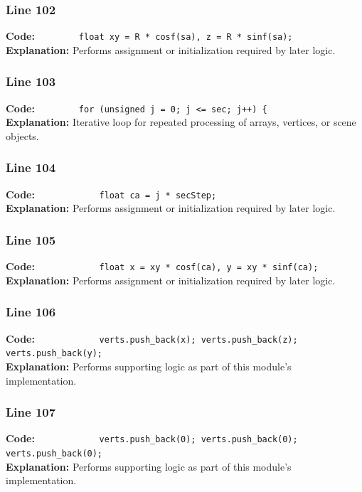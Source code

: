 \documentclass[11pt,a4paper]{article}
\begin{document}
\subsubsection*{Line 102}
\textbf{Code:} \verb|        float xy = R * cosf(sa), z = R * sinf(sa);|\\
\textbf{Explanation:} Performs assignment or initialization required by later logic.

\subsubsection*{Line 103}
\textbf{Code:} \verb|        for (unsigned j = 0; j <= sec; j++) {|\\
\textbf{Explanation:} Iterative loop for repeated processing of arrays, vertices, or scene objects.

\subsubsection*{Line 104}
\textbf{Code:} \verb|            float ca = j * secStep;|\\
\textbf{Explanation:} Performs assignment or initialization required by later logic.

\subsubsection*{Line 105}
\textbf{Code:} \verb|            float x = xy * cosf(ca), y = xy * sinf(ca);|\\
\textbf{Explanation:} Performs assignment or initialization required by later logic.

\subsubsection*{Line 106}
\textbf{Code:} \verb|            verts.push_back(x); verts.push_back(z); verts.push_back(y);|\\
\textbf{Explanation:} Performs supporting logic as part of this module's implementation.

\subsubsection*{Line 107}
\textbf{Code:} \verb|            verts.push_back(0); verts.push_back(0); verts.push_back(0);|\\
\textbf{Explanation:} Performs supporting logic as part of this module's implementation.
\end{document}

